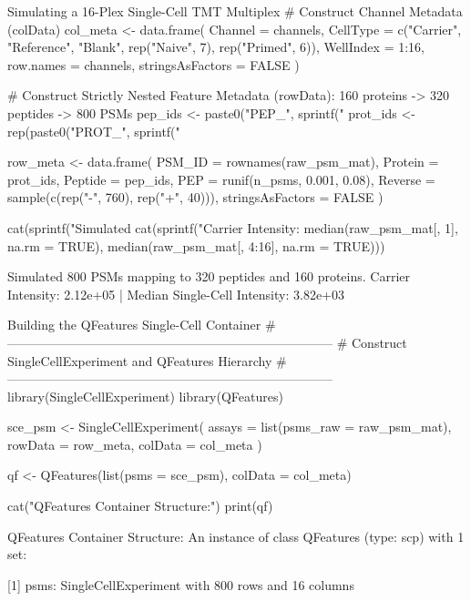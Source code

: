 \documentclass[11pt,twoside,openright]{book}
\begin{document}
\begin{rchunk}{Simulating a 16-Plex Single-Cell TMT Multiplex}
# Construct Channel Metadata (colData)
col_meta <- data.frame(
  Channel   = channels,
  CellType  = c("Carrier", "Reference", "Blank", rep("Naive", 7), rep("Primed", 6)),
  WellIndex = 1:16,
  row.names = channels,
  stringsAsFactors = FALSE
)

# Construct Strictly Nested Feature Metadata (rowData): 160 proteins -> 320 peptides -> 800 PSMs
pep_ids <- paste0("PEP_", sprintf("%
prot_ids <- rep(paste0("PROT_", sprintf("%

row_meta <- data.frame(
  PSM_ID   = rownames(raw_psm_mat),
  Protein  = prot_ids,
  Peptide  = pep_ids,
  PEP      = runif(n_psms, 0.001, 0.08),
  Reverse  = sample(c(rep("-", 760), rep("+", 40))),
  stringsAsFactors = FALSE
)

cat(sprintf("Simulated %
cat(sprintf("Carrier Intensity: %
            median(raw_psm_mat[, 1], na.rm = TRUE),
            median(raw_psm_mat[, 4:16], na.rm = TRUE)))
\end{rchunk}

\begin{routput}
Simulated 800 PSMs mapping to 320 peptides and 160 proteins.
Carrier Intensity: 2.12e+05 | Median Single-Cell Intensity: 3.82e+03
\end{routput}

\begin{rchunk}{Building the QFeatures Single-Cell Container}
# -----------------------------------------------------------------------------
# Construct SingleCellExperiment and QFeatures Hierarchy
# -----------------------------------------------------------------------------
library(SingleCellExperiment)
library(QFeatures)

sce_psm <- SingleCellExperiment(
  assays  = list(psms_raw = raw_psm_mat),
  rowData = row_meta,
  colData = col_meta
)

qf <- QFeatures(list(psms = sce_psm), colData = col_meta)

cat("QFeatures Container Structure:\n")
print(qf)
\end{rchunk}

\begin{routput}
QFeatures Container Structure:
An instance of class QFeatures (type: scp) with 1 set:

 [1] psms: SingleCellExperiment with 800 rows and 16 columns 
\end{routput}
\end{document}
